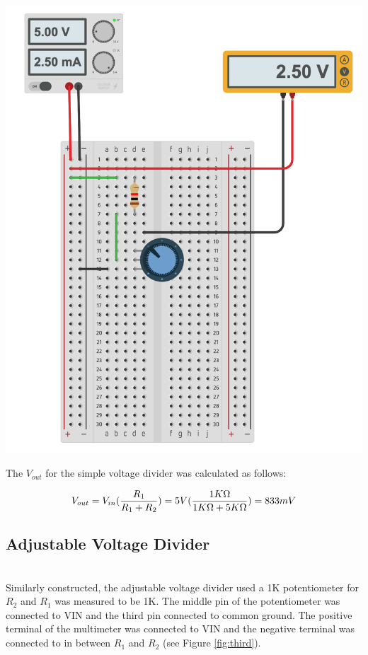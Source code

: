 \documentclass[journal]{IEEEtran}
\begin{document}
\begingroup
    \medskip
    \centering
    \includegraphics[scale=0.3]{images/lab1_3.png}
    \label{fig:third}
    \medskip
\endgroup

\noindent The $V_{out}$ for the simple voltage divider was calculated as follows:

\begin{equation}
V_{out} = V_{in} (\frac{R\textsubscript{1}}{R\textsubscript{1} + R\textsubscript{2}}) = 5V (\frac{1K\ohm}{1K\ohm + 5K\ohm}) = 833 mV
\label{eq:simplevout}
\end{equation}

\medskip


\subsection{Adjustable Voltage Divider}\\

\noindent Similarly constructed, the adjustable voltage divider used a 1K potentiometer for $R_2$ and $R_1$ was measured to be 1K\ohm. The middle pin of the potentiometer was connected to VIN and the third pin connected to common ground. The positive terminal of the multimeter was connected to VIN and the negative terminal was connected to in between $R_1$ and $R_2$ (see Figure \ref{fig:third}).\\ 
\end{document}

